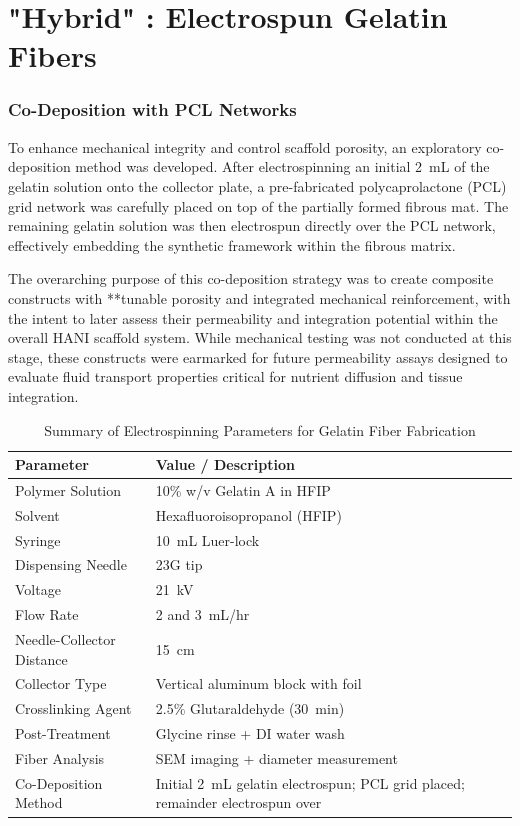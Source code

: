 \section{"Hybrid" : Electrospun Gelatin Fibers} \label{sec:ch2_electrospinning}

\subsubsection{Co-Deposition with PCL Networks}

To enhance mechanical integrity and control scaffold porosity, an exploratory co-deposition method was developed. After electrospinning an initial 2~mL of the gelatin solution onto the collector plate, a pre-fabricated polycaprolactone (PCL) grid network was carefully placed on top of the partially formed fibrous mat. The remaining gelatin solution was then electrospun directly over the PCL network, effectively embedding the synthetic framework within the fibrous matrix.

The overarching purpose of this co-deposition strategy was to create composite constructs with **tunable porosity and integrated mechanical reinforcement, with the intent to later assess their permeability and integration potential within the overall HANI scaffold system. While mechanical testing was not conducted at this stage, these constructs were earmarked for future permeability assays designed to evaluate fluid transport properties critical for nutrient diffusion and tissue integration.

\begin{table}[H]
\centering
\caption{Summary of Electrospinning Parameters for Gelatin Fiber Fabrication}
\label{tab:electrospinning_params}
\begin{tabular}{|p{5cm}|p{7cm}|}
\hline
\textbf{Parameter} & \textbf{Value / Description} \\ \hline
Polymer Solution & 10\% w/v Gelatin A in HFIP \\ \hline
Solvent & Hexafluoroisopropanol (HFIP) \\ \hline
Syringe & 10~mL Luer-lock \\ \hline
Dispensing Needle & 23G tip \\ \hline
Voltage & 21~kV \\ \hline
Flow Rate & 2 and 3~mL/hr \\ \hline
Needle-Collector Distance & 15~cm \\ \hline
Collector Type & Vertical aluminum block with foil \\ \hline
Crosslinking Agent & 2.5\% Glutaraldehyde (30~min) \\ \hline
Post-Treatment & Glycine rinse + DI water wash \\ \hline
Fiber Analysis & SEM imaging + diameter measurement \\ \hline
Co-Deposition Method & Initial 2~mL gelatin electrospun; PCL grid placed; remainder electrospun over \\ \hline
\end{tabular}
\end{table}

